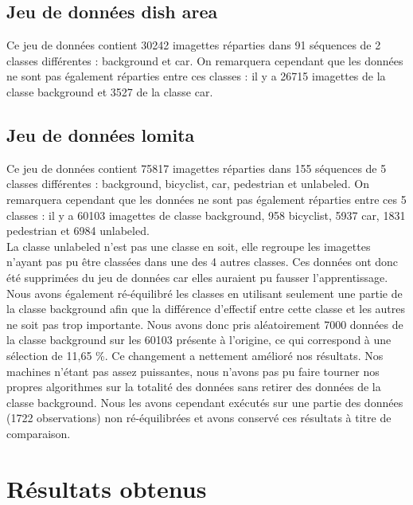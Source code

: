 \subsection{Jeu de données dish area}

	Ce jeu de données contient 30242 imagettes réparties dans 91 séquences de 2 classes différentes : background et car. On remarquera cependant que les données ne sont pas également réparties entre ces classes : il y a 26715 imagettes de la classe background et 3527 de la classe car.

\subsection{Jeu de données lomita}

	Ce jeu de données contient 75817 imagettes réparties dans 155 séquences de 5 classes différentes : background, bicyclist, car, pedestrian et unlabeled. On remarquera cependant que les données ne sont pas également réparties entre ces 5 classes : il y a 60103 imagettes de classe background, 958 bicyclist, 5937 car, 1831 pedestrian et 6984 unlabeled. \\

	La classe unlabeled n'est pas une classe en soit, elle regroupe les imagettes n'ayant pas pu être classées dans une des 4 autres classes. Ces données ont donc été supprimées du jeu de données car elles auraient pu fausser l'apprentissage. \\

	Nous avons également ré-équilibré les classes en utilisant seulement une partie de la classe background afin que la différence d'effectif entre cette classe et les autres ne soit pas trop importante. Nous avons donc pris aléatoirement 7000 données de la classe background sur les 60103 présente à l'origine, ce qui correspond à une sélection de 11,65 \%. Ce changement a nettement amélioré nos résultats. Nos machines n'étant pas assez puissantes, nous n'avons pas pu faire tourner nos propres algorithmes sur la totalité des données sans retirer des données de la classe background. Nous les avons cependant exécutés sur une partie des données (1722 observations) non ré-équilibrées et avons conservé ces résultats à titre de comparaison. \\


\section{Résultats obtenus}


